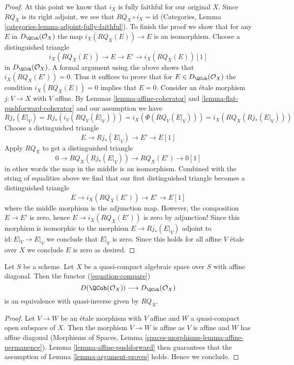 \begin{proof}
\medskip\noindent
At this point we know that $i_X$ is fully faithful for our original $X$.
Since $RQ_X$ is its right adjoint, we see that
$RQ_X \circ i_X = \text{id}$ (Categories, Lemma
\ref{categories-lemma-adjoint-fully-faithful}).
To finish the proof we show that for any
$E$ in $D_\QCoh(\mathcal{O}_X)$ the map
$i_X(RQ_X(E)) \to E$ is an isomorphism. Choose a distinguished triangle
$$
i_X(RQ_X(E)) \to E \to E' \to i_X(RQ_X(E))[1]
$$
in $D_\QCoh(\mathcal{O}_X)$. A formal argument using the
above shows that $i_X(RQ_X(E')) = 0$. Thus it suffices to prove that
for $E \in D_\QCoh(\mathcal{O}_X)$ the condition
$i_X(RQ_X(E)) = 0$ implies that $E = 0$. Consider an \'etale morphism
$j : V \to X$ with $V$ affine. By
Lemmas \ref{lemma-affine-coherator} and
\ref{lemma-flat-pushforward-coherator}
and our assumption we have
$$
Rj_*(E|_V) = Rj_*(i_V(RQ_V(E|_V))) = i_X(\Phi(RQ_V(E|_V))) =
i_X(RQ_X(Rj_*(E|_V)))
$$
Choose a distinguished triangle
$$
E \to Rj_*(E|_V) \to E' \to E[1]
$$
Apply $RQ_X$ to get a distinguished triangle
$$
0 \to RQ_X(Rj_*(E|_V)) \to RQ_X(E') \to 0[1]
$$
in other words the map in the middle is an isomorphism.
Combined with the string of equalities above we find
that our first distinguished triangle becomes a distinguished triangle
$$
E \to i_X(RQ_X(E')) \to E' \to E[1]
$$
where the middle morphism is the adjunction map. However, the composition
$E \to E'$ is zero, hence $E \to i_X(RQ_X(E'))$ is zero by adjunction!
Since this morphism is isomorphic to the morphism
$E \to Rj_*(E|_V)$ adjoint to $\text{id} : E|_V \to E|_V$ we
conclude that $E|_V$ is zero. Since this holds for all
affine $V$ \'etale over $X$ we conclude $E$ is zero as desired.
\end{proof}

\begin{proposition}
\label{proposition-quasi-compact-affine-diagonal}
Let $S$ be a scheme. Let $X$ be a quasi-compact algebraic space over $S$
with affine diagonal. Then the functor (\ref{equation-compare})
$$
D(\QCoh(\mathcal{O}_X))
\longrightarrow
D_\QCoh(\mathcal{O}_X)
$$
is an equivalence with quasi-inverse given by $RQ_X$.
\end{proposition}

\begin{proof}
Let $V \to W$ be an \'etale morphism with $V$ affine and $W$ a
quasi-compact open subspace of $X$. Then 
the morphism $V \to W$ is affine as $V$ is affine and $W$ has affine diagonal
(Morphisms of Spaces, Lemma \ref{spaces-morphisms-lemma-affine-permanence}).
Lemma \ref{lemma-affine-pushforward} then guarantees that
the assumption of Lemma \ref{lemma-argument-proves} holds.
Hence we conclude.
\end{proof}

